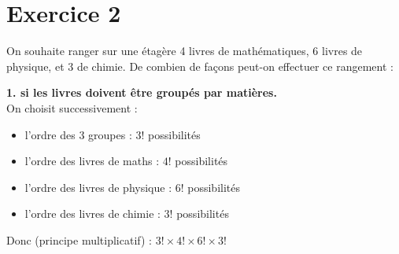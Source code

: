 \documentclass[11pt,a4paper]{article}
\begin{document}
\vspace{0.5cm}

\section*{Exercice 2}
On souhaite ranger sur une étagère 4 livres de mathématiques, 6 livres de physique, et 3 de chimie. 
De combien de façons peut-on effectuer ce rangement :

\noindent \textbf{1. si les livres doivent être groupés par matières.} \\
On choisit successivement :
\begin{itemize}
    \item l'ordre des 3 groupes : $3!$ possibilités
    
    \item l'ordre des livres de maths : $4!$ possibilités
    
    \item l'ordre des livres de physique : $6!$ possibilités
    
    \item l'ordre des livres de chimie : $3!$ possibilités
\end{itemize}
Donc (principe multiplicatif) : $3! \times 4! \times 6! \times 3!$
\end{document}
